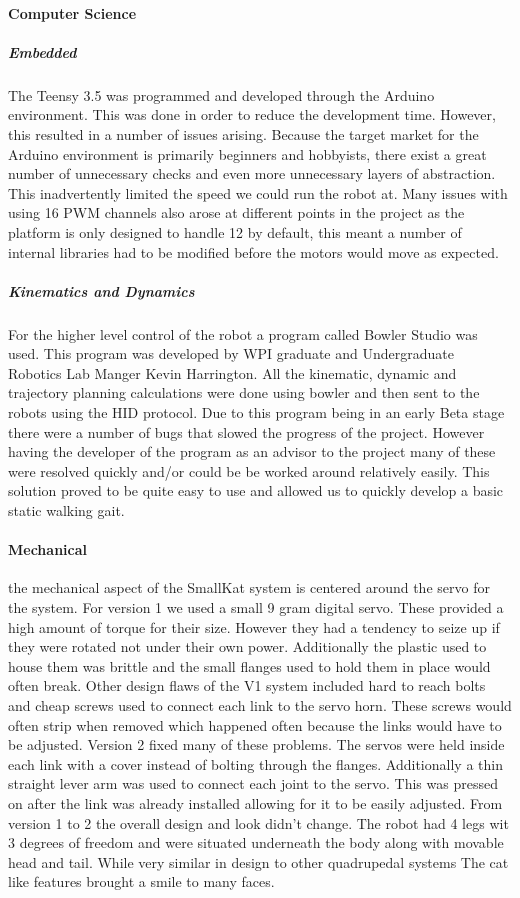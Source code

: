     \paragraph{Computer Science}
    \subparagraph{Embedded}
    The Teensy 3.5 was programmed and developed through the Arduino environment. This was done in order to reduce the development time. However, this resulted in a number of issues arising. Because the target market for the Arduino environment is primarily beginners and hobbyists, there exist a great number of unnecessary checks and even more unnecessary layers of abstraction. This inadvertently limited the speed we could run the robot at. Many issues with using 16 PWM channels also arose at different points in the project as the platform is only designed to handle 12 by default, this meant a number of internal libraries had to be modified before the motors would move as expected. 
    \subparagraph{Kinematics and Dynamics}
    For the higher level control of the robot a program called Bowler Studio was used. This program was developed by WPI graduate and Undergraduate Robotics Lab Manger Kevin Harrington. All the kinematic, dynamic and trajectory planning calculations were done using bowler and then sent to the robots using the HID protocol. Due to this program being in an early Beta stage there were a number of bugs that slowed the progress of the project. However having the developer of the program as an advisor to the project many of these were resolved quickly and/or could be be worked around relatively easily. This solution proved to be quite easy to use and allowed us to quickly develop a basic static walking gait. 
    \paragraph{Mechanical}
    the mechanical aspect of the SmallKat system is centered around the servo for the system. For version 1 we used a small 9 gram digital servo. These provided a high amount of torque for their size. However they had a tendency to seize up if they were rotated not under their own power. Additionally the plastic used to house them was brittle and the small flanges used to hold them in place would often break. Other design flaws of the V1 system included hard to reach bolts and cheap screws used to connect each link to the servo horn. These screws would often strip when removed which happened often because the links would have to be adjusted. Version 2 fixed many of these problems. The servos were held inside each link with a cover instead of bolting through the flanges. Additionally a thin straight lever arm was used to connect each joint to the servo. This was pressed on after the link was already installed allowing for it to be easily adjusted. From version 1 to 2 the overall design and look didn't change. The robot had 4 legs wit 3 degrees of freedom and were situated underneath the body along with movable head and tail. While very similar in design to other quadrupedal systems The cat like features brought a smile to many faces.
